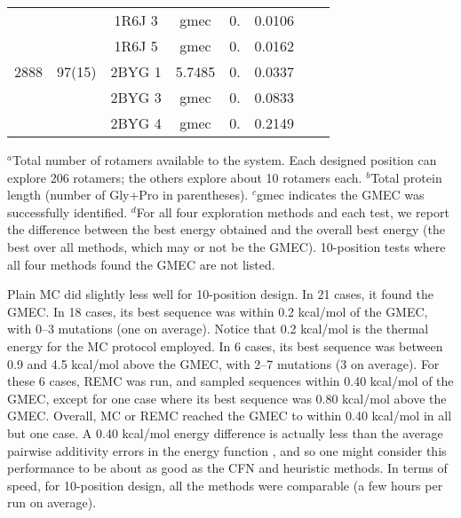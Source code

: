 {{\begin{table}[!htbp]
\begin{center}
\begin{tabular}{cccccccc}
      &         & 1R6J 3 & gmec& 0.     &  0.0106   &         \\       
      &         & 1R6J 5 & gmec& 0.     &  0.0162   &         \\        
2888  & 97(15)  & 2BYG 1 & 5.7485& 0.   &  0.0337   &         \\        
      &         & 2BYG 3 & gmec& 0.     &  0.0833   &         \\        
      &         & 2BYG 4 & gmec& 0.     &  0.2149   &         \\        
\hline
\end{tabular}
\end{center}
{\small \noindent $^a$Total number of rotamers available to the system. 
Each designed position can explore 206 rotamers; the others explore about
10 rotamers each. $^b$Total protein length (number of Gly+Pro in parentheses).
$^c$gmec indicates the GMEC was successfully identified. $^d$For all
four exploration methods and each test, we report the difference between
the best energy obtained and the overall best energy (the best over all methods,
which may or not be the GMEC). 10-position tests where all four methods found
the GMEC are not listed.
}
\end{table}




Plain MC did slightly less well for 10-position design. In 21 cases, it found the GMEC. In 18 cases, its best sequence
was within 0.2 kcal/mol of the GMEC, with 0--3 mutations (one on average). Notice that 0.2 kcal/mol is the thermal
energy for the MC protocol employed. In 6 cases, its best sequence was between 0.9 and 4.5 kcal/mol above the GMEC,
with 2--7 mutations (3 on average). For these 6 cases, REMC was run, and sampled sequences within 0.40 kcal/mol of
the GMEC, except for one case where its best sequence was 0.80 kcal/mol above the GMEC. Overall, MC or REMC reached
the GMEC to within 0.40 kcal/mol in all but one case. A 0.40 kcal/mol energy difference is actually less than the
average pairwise additivity errors in the energy function \cite{Lopes07,Schmidt08b,Gaillard14}, and so one might consider
this performance to be about as good as the CFN and heuristic methods. In terms of speed, for 10-position design,
all the methods were comparable (a few hours per run on average).

}}
